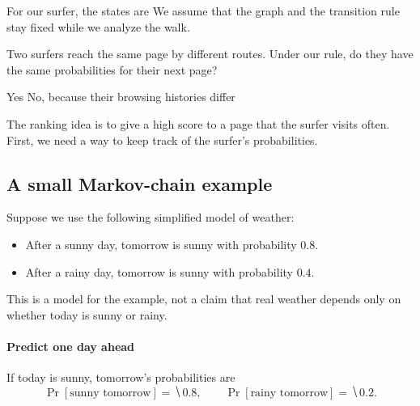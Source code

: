 \documentclass[11pt]{article}
\begin{document}
For our surfer, the states are  We assume that the graph and
the transition rule stay fixed while we analyze the walk.

\begin{Qu}
    Two surfers reach the same page by different routes. Under our rule,
    do they have the same probabilities for their next page?
    \begin{itemize}
        \aitem Yes
        \bitem No, because their browsing histories differ
    \end{itemize}
\end{Qu}

\vfill
The ranking idea is to give a high score to a page that the surfer visits
often. First, we need a way to keep track of the surfer's probabilities.

\newpage
\subsection*{A small Markov-chain example}
Suppose we use the following simplified model of weather:
\begin{itemize}
    \item After a sunny day, tomorrow is sunny with probability $0.8$.
    \item After a rainy day, tomorrow is sunny with probability $0.4$.
\end{itemize}
This is a model for the example, not a claim that real weather depends only
on whether today is sunny or rainy.

\begin{center}
\end{center}

\paragraph{Predict one day ahead}
If today is sunny, tomorrow's probabilities are
\begin{equation*}
    \Pr[\text{sunny tomorrow}]=\hide{0.8},\qquad
    \Pr[\text{rainy tomorrow}]=\hide{0.2}.
\end{equation*}
\end{document}
